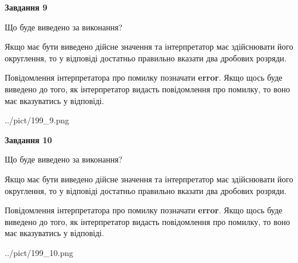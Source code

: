 \documentclass[12pt, ukrainian]{article}
\begin{document}
{\begin {Large}
{\begin {center}\textbf{Завдання 9}\end {center}}\par
Що буде виведено за виконання? \par

Якщо має бути виведено дійсне значення та інтерпретатор має здійснювати його округлення, 
то у відповіді достатньо правильно вказати два дробових розряди.

Повідомлення інтерпретатора про помилку позначати \textbf{error}.
Якщо щось буде виведено до того, як інтерпретатор видасть повідомлення про помилку, 
то воно має вказуватись у відповіді. \par

\begin{center}
	{../pict/199_9.png}
\end{center}
\newpage

{\begin {center}\textbf{Завдання 10}\end {center}}\par
Що буде виведено за виконання? \par

Якщо має бути виведено дійсне значення та інтерпретатор має здійснювати його округлення, 
то у відповіді достатньо правильно вказати два дробових розряди.

Повідомлення інтерпретатора про помилку позначати \textbf{error}.
Якщо щось буде виведено до того, як інтерпретатор видасть повідомлення про помилку, 
то воно має вказуватись у відповіді. \par

\begin{center}
	{../pict/199_10.png}
\end{center}
\newpage

\end {Large}}
\end{document}

